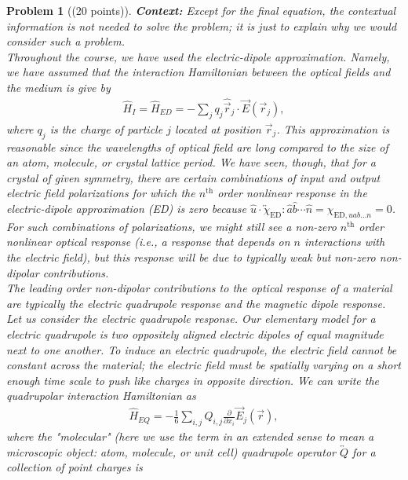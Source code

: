 \documentclass[UTF8,10pt,a4paper]{article}
\theoremstyle{Problem}
\newtheorem{prob}{Problem}
\theoremstyle{Solution}
\begin{document}
\thispagestyle{FirstPageStyle}
\begin{prob}[(20 points)]
    \textbf{Context:} Except for the final equation, the contextual information is not needed to solve the problem; it is just to explain why we would consider such a problem.\\
    Throughout the course, we have used the electric-dipole approximation. Namely, we have assumed that the interaction Hamiltonian between the optical fields and the medium is give by
    \begin{align}
        \hat{H}_I=\hat{H}_{ED}=-\sum_jq_j\hat{\vec{r}}_j\cdot\vec{E}(\vec{r}_j),
    \end{align}
    where $q_j$ is the charge of particle $j$ located at position $\vec{r}_j$. This approximation is reasonable since the wavelengths of optical field are long compared to the size of an atom, molecule, or crystal lattice period. We have seen, though, that for a crystal of given symmetry, there are certain combinations of input and output electric field polarizations for which the $n^{\text{th}}$ order nonlinear response \textit{in the electric-dipole approximation} (ED) is zero because $\hat{u}\cdot\overleftrightarrow{\chi}_{\text{ED}}:\hat{a}\hat{b}\cdots\hat{n}=\chi_{\text{ED},uab\ldots n}=0$. For such combinations of polarizations, we might still see a non-zero $n^{\text{th}}$ order nonlinear optical response (i.e., a response that depends on $n$ interactions with the electric field), but this response will be due to typically weak but non-zero non-dipolar contributions.\\
    The leading order non-dipolar contributions to the optical response of a material are typically the electric quadrupole response and the magnetic dipole response. Let us consider the electric quadrupole response. Our elementary model for a electric quadrupole is two oppositely aligned electric dipoles of equal magnitude next to one another. To \textit{induce} an electric quadrupole, the electric field cannot be constant across the material; the electric field must be spatially varying on a short enough time scale to push like charges in opposite direction. We can write the quadrupolar interaction Hamiltonian as
    \begin{align}
        \hat{H}_{EQ}=-\frac{1}{6}\sum_{i,j}Q_{i,j}\frac{\partial}{\partial x_i}\vec{E}_j(\vec{r}),
    \end{align}
    where the "molecular" (here we use the term in an extended sense to mean a microscopic object: atom, molecule, or unit cell) quadrupole operator $\overleftrightarrow{Q}$ for a collection of point charges is

\end{prob}
\end{document}
